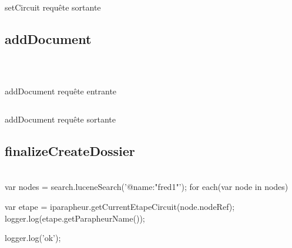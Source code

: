 \begin{codesnippet}
\inputminted[frame=single,linenos,fontsize=\footnotesize]{javascript}{extraits/setDossierProperties_out.js}
\caption{setCircuit requête sortante}
\label{snip:setDossierProperties_out}
\end{codesnippet}

\subsection{addDocument}
\\

\begin{codesnippet}
\inputminted[frame=single,linenos,fontsize=\footnotesize]{javascript}{extraits/addDocument_in.js}
\caption{addDocument requête entrante}
\label{snip:addDocument_in}
\end{codesnippet}

\begin{codesnippet}
\inputminted[frame=single,linenos,fontsize=\footnotesize]{javascript}{extraits/addDocument_out.js}
\caption{addDocument requête sortante}
\label{snip:addDocument_out}
\end{codesnippet}



\subsection{finalizeCreateDossier}
\\


var nodes = search.luceneSearch('@name:"fred1"');
for each(var node in nodes) {

    var etape = iparapheur.getCurrentEtapeCircuit(node.nodeRef);
    logger.log(etape.getParapheurName());
  
}

logger.log('ok');